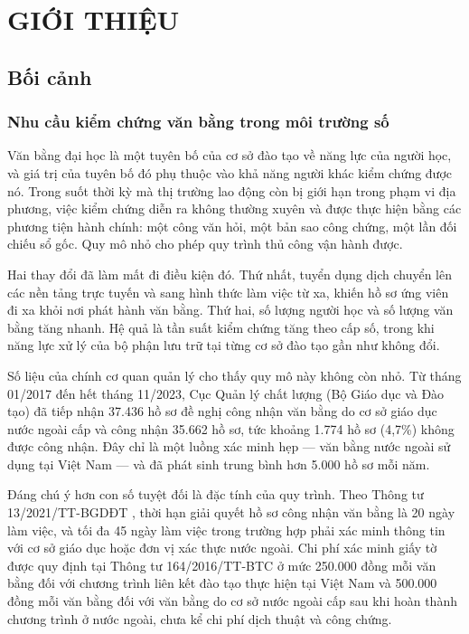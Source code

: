 \chapter{GIỚI THIỆU}

\section{Bối cảnh}

\subsection{Nhu cầu kiểm chứng văn bằng trong môi trường số}

Văn bằng đại học là một tuyên bố của cơ sở đào tạo về năng lực của người học, và giá trị của tuyên bố đó phụ thuộc vào khả năng người khác kiểm chứng được nó. Trong suốt thời kỳ mà thị trường lao động còn bị giới hạn trong phạm vi địa phương, việc kiểm chứng diễn ra không thường xuyên và được thực hiện bằng các phương tiện hành chính: một công văn hỏi, một bản sao công chứng, một lần đối chiếu sổ gốc. Quy mô nhỏ cho phép quy trình thủ công vận hành được.

Hai thay đổi đã làm mất đi điều kiện đó. Thứ nhất, tuyển dụng dịch chuyển lên các nền tảng trực tuyến và sang hình thức làm việc từ xa, khiến hồ sơ ứng viên đi xa khỏi nơi phát hành văn bằng. Thứ hai, số lượng người học và số lượng văn bằng tăng nhanh. Hệ quả là tần suất kiểm chứng tăng theo cấp số, trong khi năng lực xử lý của bộ phận lưu trữ tại từng cơ sở đào tạo gần như không đổi.

Số liệu của chính cơ quan quản lý cho thấy quy mô này không còn nhỏ. Từ tháng 01/2017 đến hết tháng 11/2023, Cục Quản lý chất lượng (Bộ Giáo dục và Đào tạo) đã tiếp nhận 37.436 hồ sơ đề nghị công nhận văn bằng do cơ sở giáo dục nước ngoài cấp và công nhận 35.662 hồ sơ, tức khoảng 1.774 hồ sơ (4,7\%) không được công nhận. Đây chỉ là một luồng xác minh hẹp --- văn bằng nước ngoài sử dụng tại Việt Nam --- và đã phát sinh trung bình hơn 5.000 hồ sơ mỗi năm.

Đáng chú ý hơn con số tuyệt đối là đặc tính của quy trình. Theo Thông tư 13/2021/TT-BGDĐT \cite{TT13_2021}, thời hạn giải quyết hồ sơ công nhận văn bằng là 20 ngày làm việc, và tối đa 45 ngày làm việc trong trường hợp phải xác minh thông tin với cơ sở giáo dục hoặc đơn vị xác thực nước ngoài. Chi phí xác minh giấy tờ được quy định tại Thông tư 164/2016/TT-BTC \cite{TT164_2016} ở mức 250.000 đồng mỗi văn bằng đối với chương trình liên kết đào tạo thực hiện tại Việt Nam và 500.000 đồng mỗi văn bằng đối với văn bằng do cơ sở nước ngoài cấp sau khi hoàn thành chương trình ở nước ngoài, chưa kể chi phí dịch thuật và công chứng.

